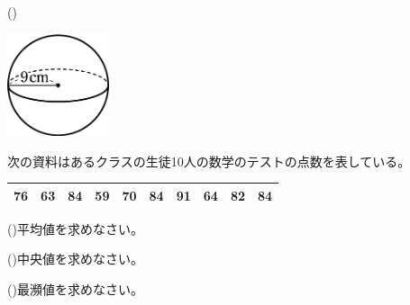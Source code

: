 \documentclass[
  12pt,a4paper,lualatex,ja=standard]{bxjsarticle}
\begin{document}
\begin{flushleft}
\begin{multicols}{3}
\begin{center}
\end{center}

\columnbreak

()\hspace{2.5pt}

\begin{center}
\def\@captype{figure}
\includegraphics[height=30mm]{img/img12.jpg}

\end{center}

\end{multicols}

\vfill

\newpage

\setcounter{skaunta}{0}

\noindent{} \hspace{1pt}次の資料はあるクラスの生徒10人の数学のテストの点数を表している。

\begin{center}
\begin{tabular}{|cccccccccc|}
\hline
76 & 63 & 84 & 59 & 70 & 84 & 91 & 64 & 82 & 84 \\
\hline
\end{tabular}
\end{center}

\begin{multicols}{2}

()\hspace{2.5pt}平均値を求めなさい。

\columnbreak

()\hspace{2.5pt}中央値を求めなさい。

\end{multicols}

\vspace{3mm}

\begin{multicols}{2}

()\hspace{2.5pt}最瀕値を求めなさい。


\end{multicols}
\end{flushleft}
\end{document}
